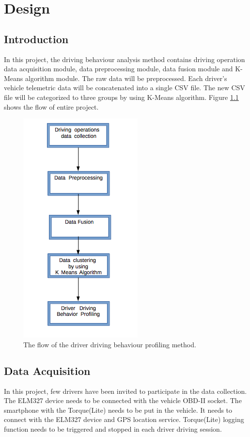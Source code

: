\chapter{Design}
\section{Introduction}
In this project, the driving behaviour analysis method contains driving operation data acquisition module, data preprocessing module, data fusion module and K-Means algorithm module. The raw data will be preprocessed. Each driver's vehicle telemetric data will be concatenated into a single CSV file. The new CSV file will be categorized to three groups by using K-Means algorithm. Figure \ref{fig:projectflow} shows the flow of entire project.

\begin{figure}[hbt!]\centering
\includegraphics[height=.4\textheight]{image/flowchart}
\caption{The flow of the driver driving behaviour profiling method. }
\label{fig:projectflow}
\end{figure}

\section{Data Acquisition}
In this project, few drivers have been invited to participate in the data collection. The ELM327 device needs to be connected with the vehicle OBD-II socket. The smartphone with the Torque(Lite) needs to be put in the vehicle. It needs to connect with the ELM327 device and GPS location service. Torque(Lite) logging function needs to be triggered and stopped in each driver driving session. 

